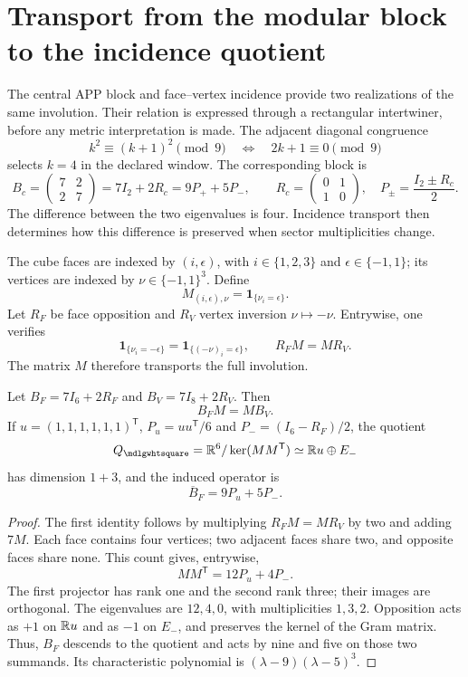 \section{Transport from the modular block to the incidence quotient}
\label{sec:incidence-transport-new}
The central APP block and face--vertex incidence provide
two realizations of the same involution. Their relation is expressed through
a rectangular intertwiner, before any metric interpretation
is made. The adjacent diagonal congruence
\[
 k^2\equiv(k+1)^2\pmod9
 \quad\Longleftrightarrow\quad 2k+1\equiv0\pmod9
\]
selects \(k=4\) in the declared window. The corresponding block is
\[
 B_c=\begin{pmatrix}7&2\\2&7\end{pmatrix}
 =7I_2+2R_c=9P_++5P_-,\qquad
 R_c=\begin{pmatrix}0&1\\1&0\end{pmatrix},\quad
 P_\pm=\frac{I_2\pm R_c}{2}.
\]
The difference between the two eigenvalues is four. Incidence
transport then determines how this difference is preserved
when sector multiplicities change.

The cube faces are indexed by \((i,\epsilon)\), with
\(i\in\{1,2,3\}\) and \(\epsilon\in\{-1,1\}\); its vertices are
indexed by \(\nu\in\{-1,1\}^3\). Define
\[
 M_{(i,\epsilon),\nu}=\mathbf1_{\{\nu_i=\epsilon\}}.
\]
Let \(R_F\) be face opposition and \(R_V\) vertex inversion
\(\nu\mapsto-\nu\). Entrywise, one verifies
\[
 \mathbf1_{\{\nu_i=-\epsilon\}}
 =\mathbf1_{\{(-\nu)_i=\epsilon\}},\qquad R_FM=MR_V.
\]
The matrix \(M\) therefore transports the full involution.

\begin{theorem}
Let \(B_F=7I_6+2R_F\) and \(B_V=7I_8+2R_V\). Then
\[
 B_FM=MB_V.
\]
If \(u=(1,1,1,1,1,1)^{\mathsf T}\),
\(P_u=uu^{\mathsf T}/6\) and \(P_-=(I_6-R_F)/2\), the quotient
\[
 Q_\square=\RR^6/\ker(MM^{\mathsf T})
 \simeq\RR u\oplus E_-
\]
has dimension \(1+3\), and the induced operator is
\[
 \overline B_F=9P_u+5P_-.
\]
\end{theorem}
\begin{proof}
The first identity follows by multiplying \(R_FM=MR_V\) by two
and adding \(7M\). Each face contains four vertices; two adjacent faces
share two, and opposite faces share none. This count gives,
entrywise,
\[
 MM^{\mathsf T}=12P_u+4P_-.
\]
The first projector has rank one and the second rank three; their images
are orthogonal. The eigenvalues are \(12,4,0\), with multiplicities
\(1,3,2\). Opposition acts as \(+1\) on \(\mathbb R u\) and as
\(-1\) on \(E_-\), and preserves the kernel of the Gram matrix. Thus,
\(B_F\) descends to the quotient and acts by nine and five on those two
summands. Its characteristic polynomial is
\((\lambda-9)(\lambda-5)^3\).
\end{proof}

